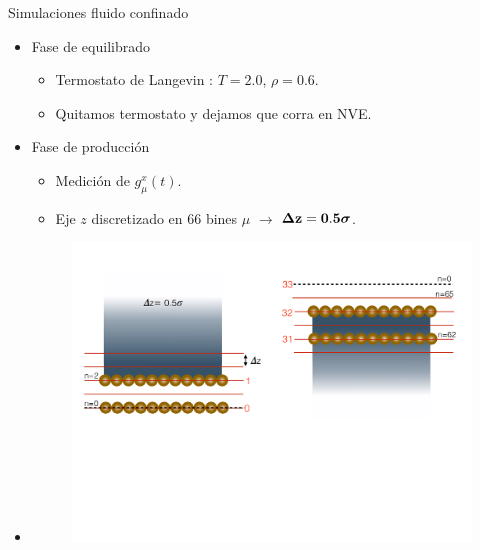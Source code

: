 \documentclass{beamer}
\begin{document}
\begin{frame}{Simulaciones fluido confinado}
   \begin{itemize}
     \item Fase de \alert{equilibrado}
       \begin{itemize}
         \item Termostato de Langevin : $T=2.0$, $\rho=0.6$.
         \item Quitamos termostato y dejamos que corra en NVE.
          \end{itemize}
        \item Fase de \alert{producción}
       \begin{itemize}
         \item Medición de $g_{\mu}^x(t)$.
         \item Eje $z$ discretizado en $66$ bines $\mu$ $\rightarrow$ {$\boldsymbol{\Delta} {\bf z=0.5}\boldsymbol{\sigma}$}.
         \end{itemize}
       \item[]
         \begin{figure}
    \includegraphics[width=\linewidth]{bin_size_top-bottom}
  \end{figure}
     \end{itemize}

 \end{frame}
\end{document}
